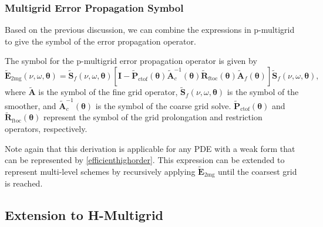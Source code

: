 \documentclass[review]{siamart190516}
\begin{document}
\subsubsection{Multigrid Error Propagation Symbol}\label{sec:multigridsymbol}

Based on the previous discussion, we can combine the expressions in p-multigrid to give the symbol of the error propagation operator.

\begin{definition}\label{def:pmultigrid_symbol}
The symbol for the p-multigrid error propagation operator is given by
\begin{equation}
\tilde{\mathbf{E}}_{\text{2mg}} \left( \nu, \omega, \boldsymbol{\theta} \right) = \tilde{\mathbf{S}}_f \left( \nu, \omega, \boldsymbol{\theta} \right) \left[ \mathbf{I} - \tilde{\mathbf{P}}_{\text{ctof}} \left( \boldsymbol{\theta} \right) \tilde{\mathbf{A}}_c^{-1} \left( \boldsymbol{\theta} \right) \tilde{\mathbf{R}}_{\text{ftoc}} \left( \boldsymbol{\theta} \right) \tilde{\mathbf{A}}_f \left( \boldsymbol{\theta} \right) \right] \tilde{\mathbf{S}}_f \left( \nu, \omega, \boldsymbol{\theta} \right),
\end{equation}
where $\tilde{\mathbf{A}}$ is the symbol of the fine grid operator, $\tilde{\mathbf{S}}_f \left( \nu, \omega, \boldsymbol{\theta} \right)$ is the symbol of the smoother, and $\tilde{\mathbf{A}}_c^{-1} \left( \boldsymbol{\theta} \right)$ is the symbol of the coarse grid solve.
$\tilde{\mathbf{P}}_{\text{ctof}} \left( \boldsymbol{\theta} \right)$ and $\tilde{\mathbf{R}}_{\text{ftoc}} \left( \boldsymbol{\theta} \right)$ represent the symbol of the grid prolongation and restriction operators, respectively.
\end{definition}

Note again that this derivation is applicable for any PDE with a weak form that can be represented by \cref{efficienthighorder}.
This expression can be extended to represent multi-level schemes by recursively applying $\tilde{\mathbf{E}}_{\text{2mg}}$ until the coarsest grid is reached.

\subsection{Extension to H-Multigrid}\label{sec:previouswork}
\end{document}
